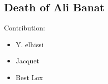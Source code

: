 \documentclass[11pt]{report}
\begin{document}
\subsection{Death of Ali Banat}

\pagebreak
Contribution: 
\begin{itemize}
\item Y. elhissi
\item Jacquet
\item Best Lox
\end{itemize}

\end{document}
